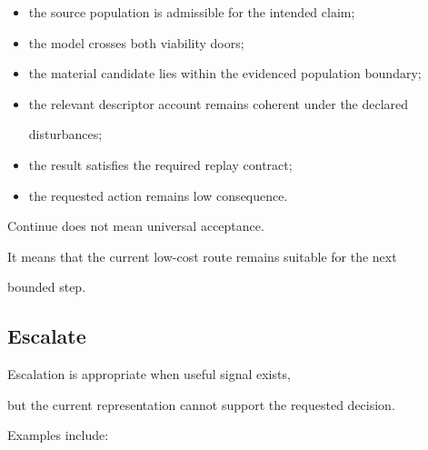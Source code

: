 \documentclass[11pt,a4paper,oneside]{report}
\begin{document}
\begin{itemize}



\item

the source population is admissible for the intended claim;



\item

the model crosses both viability doors;



\item

the material candidate lies within the evidenced population boundary;



\item

the relevant descriptor account remains coherent under the declared

disturbances;



\item

the result satisfies the required replay contract;



\item

the requested action remains low consequence.



\end{itemize}



Continue does not mean universal acceptance.



It means that the current low-cost route remains suitable for the next

bounded step.





\subsection{Escalate}



Escalation is appropriate when useful signal exists,

but the current representation cannot support the requested decision.



Examples include:
\end{document}
